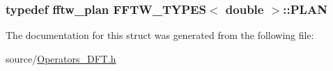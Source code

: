 \subsubsection[{P\+L\+A\+N}]{\setlength{\rightskip}{0pt plus 5cm}typedef fftw\+\_\+plan {\bf F\+F\+T\+W\+\_\+\+T\+Y\+P\+E\+S}$<$ double $>$\+::{\bf P\+L\+A\+N}}\label{struct_f_f_t_w___t_y_p_e_s_3_01double_01_4_a19c1538d166a5a9f01680c00253850ac}


The documentation for this struct was generated from the following file\+:\begin{DoxyCompactItemize}
\item 
source/\hyperlink{_operators___d_f_t_8h}{Operators\+\_\+\+D\+F\+T.\+h}\end{DoxyCompactItemize}
